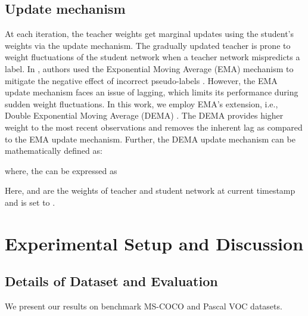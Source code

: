 \documentclass[10pt,twocolumn,letterpaper]{article}
\begin{document}
\subsection{Update mechanism}
At each iteration, the teacher weights get marginal updates using the student's weights via the update mechanism. The gradually updated teacher is prone to weight fluctuations of the student network when a teacher network mispredicts a label. 
In \cite{xu2021end, tang2021humble}, authors used the Exponential Moving Average (EMA) mechanism to mitigate the negative effect of incorrect pseudo-labels \cite{EMA}.
However, the EMA update mechanism faces an issue of lagging, which limits its performance during sudden weight fluctuations. In this work, we employ EMA's extension, i.e., Double Exponential Moving Average (DEMA) \cite{DEMA2, DEMA1}. The DEMA provides higher weight to the most recent observations and removes the inherent lag as compared to the EMA update mechanism.
Further, the DEMA update mechanism can be mathematically defined as:

where, the  can be expressed as

Here,  and  are the weights of teacher and student network at current timestamp  and  is set to .
















\section{Experimental Setup and Discussion}
\subsection{Details of Dataset and Evaluation}
We present our results on benchmark MS-COCO \cite{lin2014microsoft} and Pascal VOC \cite{pascal} datasets.
\end{document}

